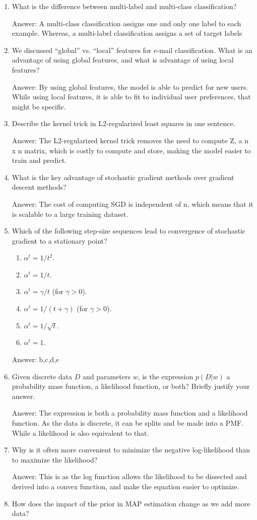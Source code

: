 \documentclass{article}
\def\ans#1{\par\gre{Answer: #1}}
\def\gre#1{{\color{gre}#1}}
\def\enum#1{\begin{enumerate}#1\end{enumerate}}
\begin{document}
\enum{
\item What is the difference between multi-label and multi-class classification?
\ans{A multi-class classification assigns one and only one label to each example. Whereas, a multi-label classification assigns a set of target labels}
\item We discussed ``global'' vs. ``local'' features for e-mail classification. What is an advantage of using global features, and what is advantage of using local features?
\ans{By using global features, the model is able to predict for new users. While using local features, it is able to fit to individual user preferences, that might be specific.}
\item Describe the kernel trick in L2-regularized least squares in one sentence.
\ans{The L2-regularized kernel trick removes the need to compute Z, a n x n matrix, which is costly to compute and store, making the model easier to train and predict.}
\item What is the key advantage of stochastic gradient methods over gradient descent methods?
\ans{The cost of computing SGD is independent of n, which means that it is scalable to a large training dataset.}
\item Which of the following step-size sequences lead to convergence of stochastic gradient to a stationary point?
\enum{
\item $\alpha^t = 1/t^2$.
\item $\alpha^t = 1/t$.
\item $\alpha^t = \gamma/t$ (for $\gamma > 0$).
\item $\alpha^t = 1/(t+\gamma)$ (for $\gamma > 0$).
\item $\alpha^t = 1/\sqrt{t}$.
\item $\alpha^t = 1$.
}
\ans{b,c,d,e}
\item{Given discrete data $D$ and parameters $w$, is the expression $p(D|w)$ a probability mass function, a likelihood function, or both? Briefly justify your answer.}
\ans{The expression is both a probability mass function and a likelihood function. As the data is discrete, it can be splits and be made into a PMF. While a likelihood is also equivalent to that.}
\item{Why is it often more convenient to minimize the negative log-likelihood than to maximize the likelihood?}
\ans{This is as the log function allows the likelihood to be dissected and derived into a convex function, and make the equation easier to optimize.}
\item How does the impact of the prior in MAP estimation change as we add more data?
}
\end{document}

